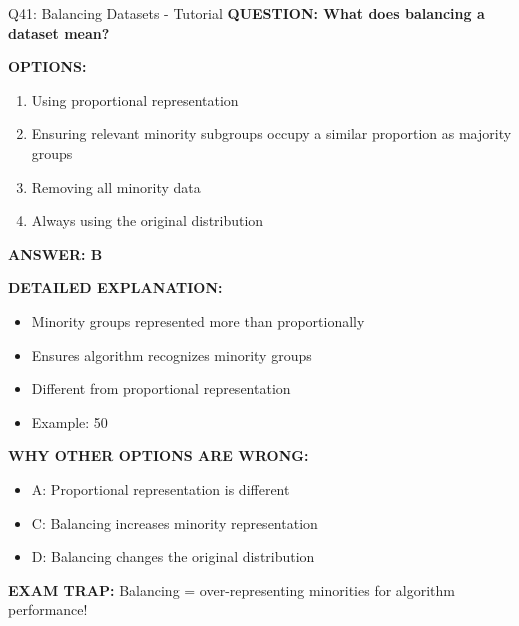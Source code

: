 \documentclass[8pt]{beamer}
\begin{document}
	\begin{frame}{Q41: Balancing Datasets - Tutorial}
		\fontsize{6.5}{7.5}\selectfont
		\textbf{QUESTION: What does balancing a dataset mean?}
		
		\vspace{0.1cm}
		\textbf{OPTIONS:}
		\begin{enumerate}
			\item Using proportional representation
			\item Ensuring relevant minority subgroups occupy a similar proportion as majority groups
			\item Removing all minority data
			\item Always using the original distribution
		\end{enumerate}
		
		\vspace{0.1cm}
		\textcolor{myblue}{\textbf{ANSWER: B}}
		
		\vspace{0.1cm}
		\textbf{DETAILED EXPLANATION:}
		\begin{itemize}
			\item Minority groups represented more than proportionally
			\item Ensures algorithm recognizes minority groups
			\item Different from proportional representation
			\item Example: 50%
		\end{itemize}
		
		\vspace{0.1cm}
		\textcolor{myred}{\textbf{WHY OTHER OPTIONS ARE WRONG:}}
		\begin{itemize}
			\item \textcolor{myred}{A:} Proportional representation is different
			\item \textcolor{myred}{C:} Balancing increases minority representation
			\item \textcolor{myred}{D:} Balancing changes the original distribution
		\end{itemize}
		
		\textcolor{myred}{\textbf{EXAM TRAP:}} Balancing = \textcolor{myblue}{over-representing minorities} for algorithm performance!
	\end{frame}
	
\end{document}
